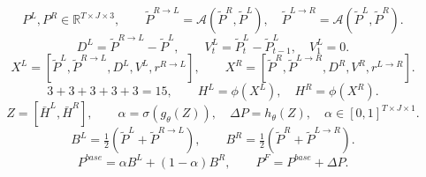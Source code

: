 

\[
P^L,P^R \in \mathbb{R}^{T\times J\times 3},\qquad
\tilde P^{R\to L}=\mathcal A(\tilde P^R,\tilde P^L),\quad
\tilde P^{L\to R}=\mathcal A(\tilde P^L,\tilde P^R).
\]
\[
D^L=\tilde P^{R\to L}-\tilde P^L,\qquad
V^L_t=\tilde P^L_t-\tilde P^L_{t-1},\quad V^L_1=0.
\]
\[
X^L=[\tilde P^L,\tilde P^{R\to L},D^L,V^L,r^{R\to L}],\qquad
X^R=[\tilde P^R,\tilde P^{L\to R},D^R,V^R,r^{L\to R}].
\]
\[
3+3+3+3+3=15,\qquad H^L=\phi(X^L),\quad H^R=\phi(X^R).
\]
\[
Z=[\bar H^L,\bar H^R],\qquad
\alpha=\sigma(g_\theta(Z)),\quad \Delta P=h_\theta(Z),\quad
\alpha\in[0,1]^{T\times J\times1}.
\]
\[
B^L=\tfrac12(\tilde P^L+\tilde P^{R\to L}),\qquad
B^R=\tfrac12(\tilde P^R+\tilde P^{L\to R}).
\]
\[
P^{base}=\alpha B^L+(1-\alpha)B^R,\qquad
P^F=P^{base}+\Delta P.
\]



